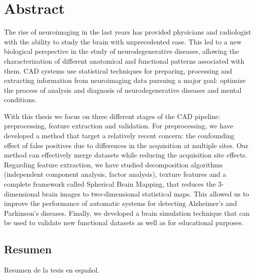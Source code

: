 \begingroup
\let\clearpage\relax
\let\cleardoublepage\relax
\let\cleardoublepage\relax

\chapter*{Abstract}
The rise of neuroimaging in the last years has provided physicians and radiologist with the ability to study the brain with unprecedented ease. This led to a new biological perspective in the study of neurodegenerative diseases, allowing the characterization of different anatomical and functional patterns associated with them. \acf{CAD} systems use statistical techniques for preparing, processing and extracting information from neuroimaging data pursuing a major goal: optimize the process of analysis and diagnosis of neurodegenerative diseases and mental conditions.

With this thesis we focus on three different stages of the \acf{CAD} pipeline: preprocessing, feature extraction and validation. For preprocessing, we have developed a method that target a relatively recent concern: the confounding effect of false positives due to differences in the acquisition at multiple sites. Our method can effectively merge datasets while reducing the acquisition site effects. Regarding feature extraction, we have studied decomposition algorithms (independent component analysis, factor analysis), texture features and a complete framework called Spherical Brain Mapping, that reduces the 3-dimensional brain images to two-dimensional statistical maps. This allowed us to improve the performance of automatic systems for detecting Alzheimer's and Parkinson's diseases. Finally, we developed a brain simulation technique that can be used to validate new functional datasets as well as for educational purposes. 

\begin{otherlanguage}{spanish}
\chapter*{Resumen}
Resumen de la tesis en español. 
\end{otherlanguage}

\endgroup			

\vfill